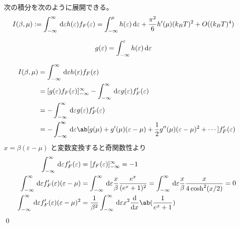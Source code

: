 \documentclass[uplatex,diffipdfmx,a4paper,11pt]{jlreq}
\makeatletter
\numberwithin{equation}{section}
\theoremstyle{definition}
\renewenvironment{proof}[1][\proofname]{\par
  \normalfont
  \topsep6\p@\@plus6\p@ \trivlist
  \item[\hskip\labelsep{\bfseries #1}\@addpunct{\bfseries}]\ignorespaces\quad\par
}{%
  \qed\endtrivlist\@endpefalse
}
\renewcommand\proofname{証明}
\makeatother
\begin{document}
\begin{theorem}[ゾンマーフェルト展開]
  次の積分を次のように展開できる。
  \begin{align}
    I(\beta, \mu) & := \int_{-\infty}^{\infty}\dl{\varepsilon}h(\varepsilon)f_F(\varepsilon) = \int_{-\infty}^\mu h(\varepsilon)\dl{\varepsilon} + \frac{\pi^2}{6}h'(\mu)(k_BT)^2 + O((k_BT)^{4})
  \end{align}
\end{theorem}
\begin{proof}
  \begin{align}
    g(\varepsilon) & = \int_{-\infty}^\varepsilon h(\varepsilon)\dl{\varepsilon}
  \end{align}

  \begin{align}
    I(\beta, \mu) & = \int_{-\infty}^{\infty}\dl{\varepsilon}h(\varepsilon)f_F(\varepsilon)                                                                                  \\
                  & = [g(\varepsilon)f_F(\varepsilon)]_{-\infty}^{\infty} - \int_{-\infty}^{\infty}\dl{\varepsilon}g(\varepsilon)f_F'(\varepsilon)                           \\
                  & = - \int_{-\infty}^{\infty}\dl{\varepsilon}g(\varepsilon)f_F'(\varepsilon)                                                                               \\
                  & = - \int_{-\infty}^{\infty}\dl{\varepsilon}\ab[g(\mu) + g'(\mu)(\varepsilon - \mu) + \frac{1}{2}g''(\mu)(\varepsilon - \mu)^2 + \cdots]f_F'(\varepsilon)
  \end{align}
  $x = \beta(\varepsilon - \mu)$ と変数変換すると奇関数性より
  \begin{align}
    \int_{-\infty}^{\infty}\dl{\varepsilon}f_F'(\varepsilon)                      & = [f_F(\varepsilon)]_{-\infty}^{\infty} = -1                                                                                                                        \\
    \int_{-\infty}^{\infty}\dl{\varepsilon}f_F'(\varepsilon)(\varepsilon - \mu)   & = \int_{-\infty}^{\infty}\dl{\varepsilon}\frac{x}{\beta}\frac{e^x}{(e^x + 1)^2} = \int_{-\infty}^{\infty}\dl{\varepsilon}\frac{x}{\beta}\frac{x}{4\cosh^2(x/2)} = 0 \\
    \int_{-\infty}^{\infty}\dl{\varepsilon}f_F'(\varepsilon)(\varepsilon - \mu)^2 & = \frac{1}{\beta^2}\int_{-\infty}^{\infty}\dl{\varepsilon}x^2\diff{}{x}\ab(\frac{1}{e^x + 1})                                                                       \\

\end{align}
\end{proof}
\end{document}
